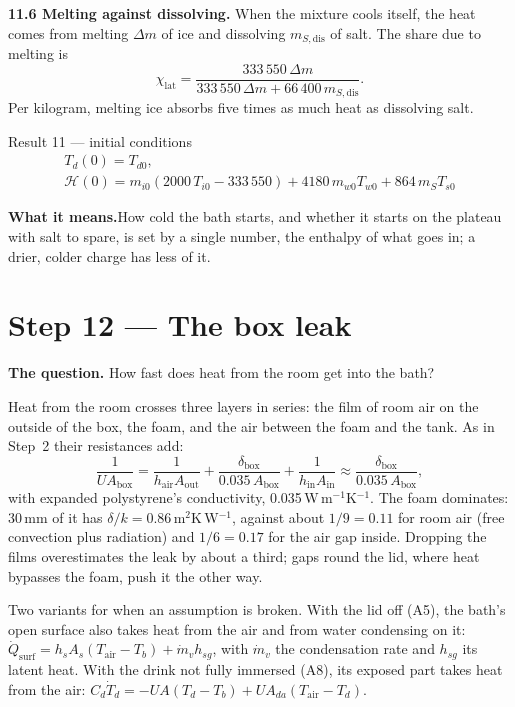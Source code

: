 \documentclass[11pt,a4paper]{article}
\newcommand{\Hb}{\mathcal{H}}
\newcommand{\UAbox}{UA_{\mathrm{box}}}
\newcommand{\step}[1]{\section*{#1}\addcontentsline{toc}{section}{#1}}
\newcommand{\sub}[1]{\par\smallskip\noindent\textbf{#1}\enspace}
\newcommand{\means}{\par\noindent\textbf{What it means.}\enspace}
\begin{document}
\sub{11.6 Melting against dissolving.} When the mixture cools itself, the heat comes from melting
$\Delta m$ of ice and dissolving $m_{S,\mathrm{dis}}$ of salt. The share due to melting is
\[ \chi_{\mathrm{lat}} = \frac{333\,550\,\Delta m}{333\,550\,\Delta m + 66\,400\,m_{S,\mathrm{dis}}}. \]
Per kilogram, melting ice absorbs five times as much heat as dissolving salt.

\begin{result}{Result 11 --- initial conditions}
\begin{gather*}
T_d(0) = T_{d0},\\
\Hb(0) = m_{i0}(2000\,T_{i0} - 333\,550) + 4180\,m_{w0}T_{w0} + 864\,m_ST_{s0}
\end{gather*}
\end{result}
\means How cold the bath starts, and whether it starts on the plateau with salt to spare, is set by a
single number, the enthalpy of what goes in; a drier, colder charge has less of it.

\step{Step 12 --- The box leak}

\textbf{The question.} How fast does heat from the room get into the bath?

Heat from the room crosses three layers in series: the film of room air on the outside of the box, the
foam, and the air between the foam and the tank. As in Step~2 their resistances add:
\[
\frac{1}{\UAbox} = \frac{1}{h_{\mathrm{air}}A_{\mathrm{out}}} + \frac{\delta_{\mathrm{box}}}{0.035\,A_{\mathrm{box}}}
+ \frac{1}{h_{\mathrm{in}}A_{\mathrm{in}}}
\approx \frac{\delta_{\mathrm{box}}}{0.035\,A_{\mathrm{box}}},
\]
with expanded polystyrene's conductivity, 0.035\,W\,m$^{-1}$K$^{-1}$. The foam dominates: 30\,mm of it has
$\delta/k = 0.86$\,m$^2$K\,W$^{-1}$, against about $1/9 = 0.11$ for room air (free convection plus radiation)
and $1/6 = 0.17$ for the air gap inside. Dropping the films overestimates the leak by about a third;
gaps round the lid, where heat bypasses the foam, push it the other way.

Two variants for when an assumption is broken. With the lid off (A5), the bath's open surface also takes
heat from the air and from water condensing on it: $\dot Q_{\mathrm{surf}} = h_sA_s(T_{\mathrm{air}} - T_b)
+ \dot m_vh_{sg}$, with $\dot m_v$ the condensation rate and $h_{sg}$ its latent heat. With the drink not
fully immersed (A8), its exposed part takes heat from the air:
$C_d\dot T_d = -UA(T_d - T_b) + UA_{da}(T_{\mathrm{air}} - T_d)$.
\end{document}
